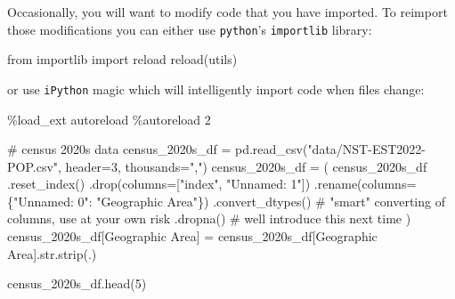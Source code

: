 \documentclass[
  letterpaper,
  DIV=11,
  numbers=noendperiod]{scrreprt}
\newenvironment{Shaded}{\begin{snugshade}}{\end{snugshade}}
\newcommand{\BuiltInTok}[1]{\textcolor[rgb]{0.00,0.23,0.31}{#1}}
\newcommand{\CommentTok}[1]{\textcolor[rgb]{0.37,0.37,0.37}{#1}}
\newcommand{\DecValTok}[1]{\textcolor[rgb]{0.68,0.00,0.00}{#1}}
\newcommand{\ImportTok}[1]{\textcolor[rgb]{0.00,0.46,0.62}{#1}}
\newcommand{\NormalTok}[1]{\textcolor[rgb]{0.00,0.23,0.31}{#1}}
\newcommand{\OperatorTok}[1]{\textcolor[rgb]{0.37,0.37,0.37}{#1}}
\newcommand{\StringTok}[1]{\textcolor[rgb]{0.13,0.47,0.30}{#1}}
\begin{document}
Occasionally, you will want to modify code that you have imported. To
reimport those modifications you can either use \texttt{python}'s
\texttt{importlib} library:

\begin{Shaded}
\begin{Highlighting}[]
\ImportTok{from}\NormalTok{ importlib }\ImportTok{import} \BuiltInTok{reload}
\BuiltInTok{reload}\NormalTok{(utils)}
\end{Highlighting}
\end{Shaded}

or use \texttt{iPython} magic which will intelligently import code when
files change:

\begin{Shaded}
\begin{Highlighting}[]
\OperatorTok{\%}\NormalTok{load\_ext autoreload}
\OperatorTok{\%}\NormalTok{autoreload }\DecValTok{2}
\end{Highlighting}
\end{Shaded}

\begin{Shaded}
\begin{Highlighting}[]
\CommentTok{\# census 2020s data}
\NormalTok{census\_2020s\_df }\OperatorTok{=}\NormalTok{ pd.read\_csv(}\StringTok{"data/NST{-}EST2022{-}POP.csv"}\NormalTok{, header}\OperatorTok{=}\DecValTok{3}\NormalTok{, thousands}\OperatorTok{=}\StringTok{","}\NormalTok{)}
\NormalTok{census\_2020s\_df }\OperatorTok{=}\NormalTok{ (}
\NormalTok{    census\_2020s\_df}
\NormalTok{    .reset\_index()}
\NormalTok{    .drop(columns}\OperatorTok{=}\NormalTok{[}\StringTok{"index"}\NormalTok{, }\StringTok{"Unnamed: 1"}\NormalTok{])}
\NormalTok{    .rename(columns}\OperatorTok{=}\NormalTok{\{}\StringTok{"Unnamed: 0"}\NormalTok{: }\StringTok{"Geographic Area"}\NormalTok{\})}
\NormalTok{    .convert\_dtypes()                 }\CommentTok{\# "smart" converting of columns, use at your own risk}
\NormalTok{    .dropna()                         }\CommentTok{\# we\textquotesingle{}ll introduce this next time}
\NormalTok{)}
\NormalTok{census\_2020s\_df[}\StringTok{\textquotesingle{}Geographic Area\textquotesingle{}}\NormalTok{] }\OperatorTok{=}\NormalTok{ census\_2020s\_df[}\StringTok{\textquotesingle{}Geographic Area\textquotesingle{}}\NormalTok{].}\BuiltInTok{str}\NormalTok{.strip(}\StringTok{\textquotesingle{}.\textquotesingle{}}\NormalTok{)}

\NormalTok{census\_2020s\_df.head(}\DecValTok{5}\NormalTok{)}
\end{Highlighting}
\end{Shaded}
\end{document}
